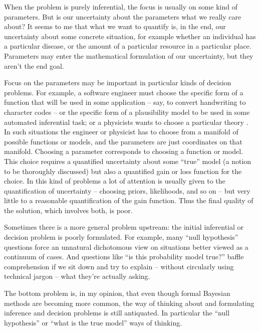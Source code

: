 \documentclass[\ifafour a4paper,12pt,\else a5paper,10pt,\fi%
onecolumn,oneside,article,%
british%
]{memoir}
\theoremstyle{remark}
\theoremstyle{innote}
\newcommand*{\citep}{\parencites}
\renewcommand*{\|}{\mathpunct{|}}
\begin{document}
When the problem is purely inferential, the focus is usually on some kind
of parameters. But is our uncertainty about the parameters what we really
care about? It seems to me that what we want to quantify is, in the end,
our uncertainty about some concrete situation, for example whether an
individual has a particular disease, or the amount of a particular resource
in a particular place. Parameters may enter the mathematical formulation of
our uncertainty, but they aren't the end goal.

Focus on the parameters may be important in particular kinds of decision
problems. For example, a software engineer must choose the specific form of
a function that will be used in some application -- say, to convert
handwriting to character codes -- or the specific form of a plausibility
model to be used in some automated inferential task; or a physicists wants
to choose a particular theory \citep[a problem especially considered
by][]{jeffreys1931_r1973,jeffreys1939_r1983}. In such situations the
engineer or physicist has to choose from a manifold of possible functions
or models, and the parameters are just coordinates on that manifold.
Choosing a parameter corresponds to choosing a function or model. This
choice requires a quantified uncertainty about some \enquote{true} model (a
notion to be thoroughly discussed) but also a quantified gain or loss
function for the choice. In this kind of problems a lot of attention is
usually given to the quantification of uncertainty -- choosing priors,
likelihoods, and so on -- but very little to a reasonable quantification of
the gain function. Thus the final quality of the solution, which involves
both, is poor.

Sometimes there is a more general problem upstream: the initial inferential
or decision problem is poorly formulated. For example, many \enquote{null
  hypothesis} questions force an unnatural dichotomous view on situations
better viewed as a continuum of cases. And questions like \enquote{is this
  probability model true?} baffle comprehension if we sit down and try to
explain -- without circularly using technical jargon -- what they're
actually asking.

The bottom problem is, in my opinion, that even though formal Bayesian
methods are becoming more common, the way of thinking about and formulating
inference and decision problems is still antiquated. In particular the
\enquote{null hypothesis} or \enquote{what is the true model} ways of
thinking.
\end{document}
